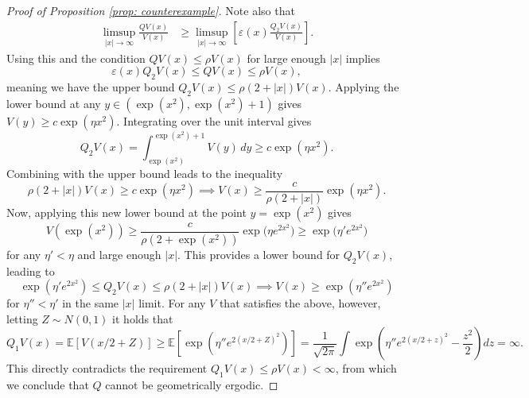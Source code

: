\documentclass{article}
\theoremstyle{definition}
\theoremstyle{plain}
\begin{document}
\begin{proof}[Proof of Proposition \ref{prop: counterexample}]
Note also that
\begin{align*}
    \limsup_{|x|\to\infty}\frac{QV(x)}{V(x)} 
    &\ge \limsup_{|x|\to\infty} \left[\varepsilon(x)\frac{Q_2V(x)}{V(x)}\right].
\end{align*}
Using this and the condition $QV(x) \leq \rho V(x)$ for large enough $|x|$ implies
\[
\varepsilon(x)Q_2V(x) \leq QV(x) \leq \rho V(x),
\]
meaning we have the upper bound $Q_2V(x) \leq \rho(2+|x|)V(x)$.  
Applying the lower bound at any $y \in (\exp(x^2), \exp(x^2)+1)$ gives $V(y) \geq c\exp(\eta x^2)$. Integrating over the unit interval gives
\[
Q_2V(x) = \int_{\exp(x^2)}^{\exp(x^2)+1} V(y)\,dy \geq c\exp(\eta x^2).
\]
Combining with the upper bound leads to the inequality
\[
\rho(2+|x|)V(x) \geq c\exp(\eta x^2) \implies V(x) \geq \frac{c}{\rho(2+|x|)}\exp(\eta x^2).
\]
Now, applying this new lower bound at the point $y = \exp(x^2)$ gives
\[
V(\exp(x^2)) \geq \frac{c}{\rho(2+\exp(x^2))}\exp\bigl(\eta e^{2x^2}\bigr) \geq \exp\bigl(\eta' e^{2x^2}\bigr)
\]
for any $\eta' < \eta$ and large enough $|x|$.  This provides a lower bound for $Q_2V(x)$, leading to
\[
\exp(\eta' e^{2x^2}) \leq Q_2V(x) \leq \rho(2+|x|)V(x) \implies V(x) \geq \exp(\eta'' e^{2x^2})
\]
for $\eta''< \eta'$ in the same $|x|$ limit.  For any $V$ that satisfies the above, however, letting $Z \sim N(0,1)$ it holds that
\[
Q_1V(x) 
= 
\mathbb{E}[V(x/2+Z)] 
\geq 
\mathbb{E}\left[\exp\left(\eta''  e^{2(x/2+Z)^2}\right)\right] 
= 
\frac{1}{\sqrt{2\pi}}\int \exp\left(\eta'' e^{2(x/2+z)^2} - \frac{z^2}{2}\right)dz = \infty.
\]
This directly contradicts the requirement $Q_1V(x) \leq \rho V(x) < \infty$, from which we conclude that $Q$ cannot be geometrically ergodic.


\end{proof}
\end{document}

